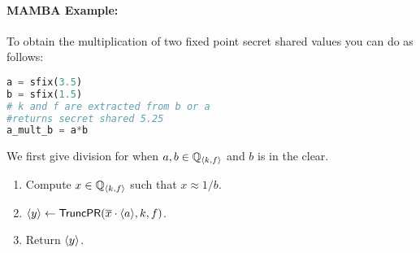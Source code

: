 \paragraph{MAMBA Example:} To obtain the multiplication of two fixed point secret shared values you can do as follows:
\begin{lstlisting}[language={python}]
a = sfix(3.5)
b = sfix(1.5)
# k and f are extracted from b or a
#returns secret shared 5.25
a_mult_b = a*b
\end{lstlisting}

We first give division for when $a, b \in {\mathbb{Q}}_{\langle k, f \rangle}$ and $b$ is in the clear.
\begin{enumerate}
\item Compute $x \in {\mathbb{Q}}_{\langle k, f \rangle}$ such that $x \approx 1/b$.
\item $\langle y \rangle \leftarrow \mathsf{TruncPR}(\overline{x} \cdot \langle a \rangle,k,f)$.
\item Return $\langle y \rangle$.
\end{enumerate}

